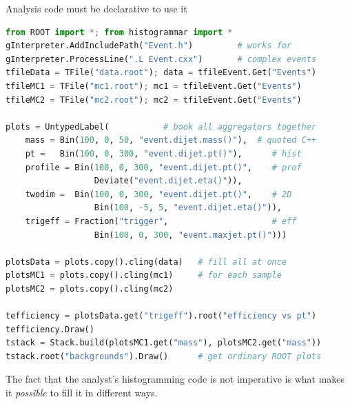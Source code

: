 \documentclass{beamer}
\begin{document}
\begin{frame}[fragile]{Analysis code must be declarative to use it}
\vspace{0.1 cm}
\begin{lstlisting}[language=python]
from ROOT import *; from histogrammar import *             
gInterpreter.AddIncludePath("Event.h")         # works for
gInterpreter.ProcessLine(".L Event.cxx")       # complex events
tfileData = TFile("data.root"); data = tfileEvent.Get("Events")
tfileMC1 = TFile("mc1.root"); mc1 = tfileEvent.Get("Events")
tfileMC2 = TFile("mc2.root"); mc2 = tfileEvent.Get("Events")

plots = UntypedLabel(           # book all aggregators together
    mass = Bin(100, 0, 50, "event.dijet.mass()"),  # quoted C++
    pt =   Bin(100, 0, 300, "event.dijet.pt()"),      # hist
    profile = Bin(100, 0, 300, "event.dijet.pt()",    # prof
                  Deviate("event.dijet.eta()")),
    twodim =  Bin(100, 0, 300, "event.dijet.pt()",    # 2D
                  Bin(100, -5, 5, "event.dijet.eta()")),
    trigeff = Fraction("trigger",                     # eff
                  Bin(100, 0, 300, "event.maxjet.pt()")))

plotsData = plots.copy().cling(data)   # fill all at once
plotsMC1 = plots.copy().cling(mc1)     # for each sample
plotsMC2 = plots.copy().cling(mc2)

tefficiency = plotsData.get("trigeff").root("efficiency vs pt")
tefficiency.Draw()
tstack = Stack.build(plotsMC1.get("mass"), plotsMC2.get("mass"))
tstack.root("backgrounds").Draw()      # get ordinary ROOT plots
\end{lstlisting}
\end{frame}

\begin{frame}{}
The fact that the analyst's histogramming code is not imperative is what makes it {\it possible} to fill it in different ways.
\end{frame}
\end{document}
